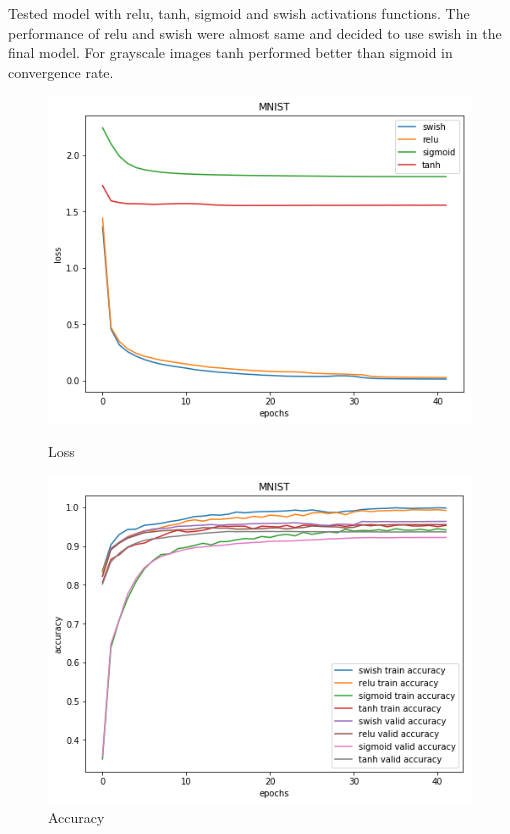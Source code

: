 \documentclass{article}
\begin{document}
Tested model with relu, tanh, sigmoid and swish activations functions. The performance of relu and swish were almost same and decided to use swish in the final model. For grayscale images tanh performed better than sigmoid in convergence rate.

\begin{figure}[!htb]
	\includegraphics[width=\linewidth]{../output_plots/part_1_task_3_loss.png}
	\caption{Loss}\label{fig:part_1_task_3_loss}
	\endminipage\hfill
	\includegraphics[width=\linewidth]{../output_plots/part_1_task_3_accuracy.png}
	\caption{Accuracy}\label{fig:part_1_task_3_accuracy}
	\endminipage\hfill

\end{figure}
\end{document}
